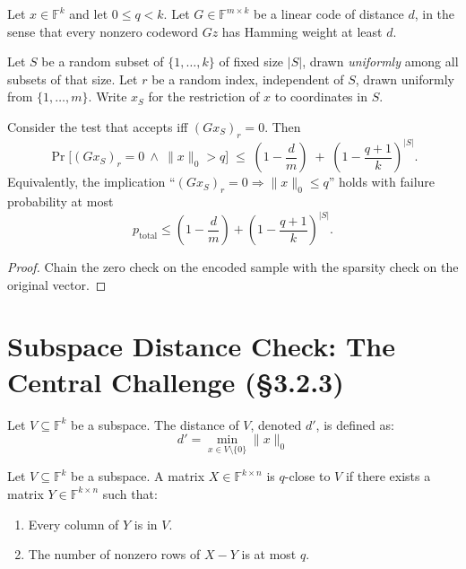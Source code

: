 \begin{lemma}\label{lem:sparsity_zero_composition}\leanok {}
Let $x \in \mathbb{F}^k$ and let $0 \le q < k$.
Let $G \in \mathbb{F}^{m \times k}$ be a linear code of distance $d$, in the sense that
every nonzero codeword $Gz$ has Hamming weight at least $d$.

Let $S$ be a random subset of $\{1,\ldots,k\}$ of fixed size $|S|$, drawn \emph{uniformly}
among all subsets of that size.
Let $r$ be a random index, independent of $S$, drawn uniformly from $\{1,\ldots,m\}$.
Write $x_S$ for the restriction of $x$ to coordinates in $S$.

Consider the test that accepts iff $(G x_S)_r = 0$. Then
\[
  \Pr\big[ (G x_S)_r = 0 \ \wedge\ \|x\|_0 > q \big]
  \;\le\;
  \left(1 - \frac{d}{m}\right)
  \;+\;
  \left(1 - \frac{q+1}{k}\right)^{|S|}.
\]
Equivalently, the implication “$(Gx_S)_r = 0 \Rightarrow \|x\|_0 \le q$” holds with
failure probability at most
\[
  p_{\mathrm{total}} \le \left(1 - \frac{d}{m}\right) + \left(1 - \frac{q+1}{k}\right)^{|S|}.
\]
\end{lemma}
\begin{proof} \leanok
Chain the zero check on the encoded sample with the sparsity check on the original vector.
\end{proof}

\section*{Subspace Distance Check: The Central Challenge (§3.2.3)}

\begin{definition}\label{def:subspace_distance}\leanok
Let $V \subseteq \mathbb{F}^k$ be a subspace. The distance of $V$, denoted $d'$, is defined as:
\[ d' = \min_{x \in V \setminus \{0\}} \|x\|_0 \]
\end{definition}

\begin{definition}\label{def:q_close_subspace}\leanok
Let $V \subseteq \mathbb{F}^k$ be a subspace. A matrix $X \in \mathbb{F}^{k \times n}$ is $q$-close to $V$ if there exists a matrix $Y \in \mathbb{F}^{k \times n}$ such that:
\begin{enumerate}
    \item Every column of $Y$ is in $V$.
    \item The number of nonzero rows of $X-Y$ is at most $q$.
\end{enumerate}
\end{definition}

